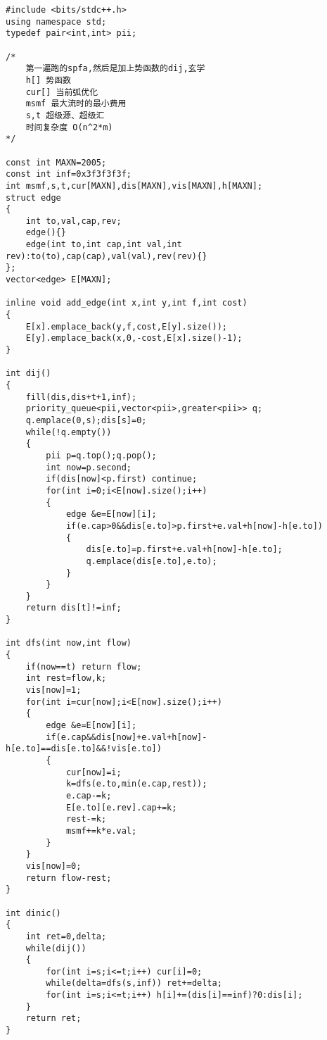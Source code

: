 \begin{lstlisting}
#include <bits/stdc++.h>
using namespace std;
typedef pair<int,int> pii;

/*
    第一遍跑的spfa,然后是加上势函数的dij,玄学
    h[] 势函数
    cur[] 当前弧优化
    msmf 最大流时的最小费用
    s,t 超级源、超级汇
    时间复杂度 O(n^2*m)
*/

const int MAXN=2005;
const int inf=0x3f3f3f3f;
int msmf,s,t,cur[MAXN],dis[MAXN],vis[MAXN],h[MAXN];
struct edge
{
    int to,val,cap,rev;
    edge(){}
    edge(int to,int cap,int val,int rev):to(to),cap(cap),val(val),rev(rev){}
};
vector<edge> E[MAXN];

inline void add_edge(int x,int y,int f,int cost)
{
    E[x].emplace_back(y,f,cost,E[y].size());
    E[y].emplace_back(x,0,-cost,E[x].size()-1);
}

int dij()
{
    fill(dis,dis+t+1,inf);
    priority_queue<pii,vector<pii>,greater<pii>> q;
    q.emplace(0,s);dis[s]=0;
    while(!q.empty())
    {
        pii p=q.top();q.pop();
        int now=p.second;
        if(dis[now]<p.first) continue;
        for(int i=0;i<E[now].size();i++)
        {
            edge &e=E[now][i];
            if(e.cap>0&&dis[e.to]>p.first+e.val+h[now]-h[e.to])
            {
                dis[e.to]=p.first+e.val+h[now]-h[e.to];
                q.emplace(dis[e.to],e.to);
            }
        }
    }
    return dis[t]!=inf;
}

int dfs(int now,int flow)
{
    if(now==t) return flow;
    int rest=flow,k;
    vis[now]=1;
    for(int i=cur[now];i<E[now].size();i++)
    {
        edge &e=E[now][i];
        if(e.cap&&dis[now]+e.val+h[now]-h[e.to]==dis[e.to]&&!vis[e.to])
        {
            cur[now]=i;
            k=dfs(e.to,min(e.cap,rest));
            e.cap-=k;
            E[e.to][e.rev].cap+=k;
            rest-=k;
            msmf+=k*e.val;
        }
    }
    vis[now]=0;
    return flow-rest;
}

int dinic()
{
    int ret=0,delta;
    while(dij())
    {
        for(int i=s;i<=t;i++) cur[i]=0;
        while(delta=dfs(s,inf)) ret+=delta;
        for(int i=s;i<=t;i++) h[i]+=(dis[i]==inf)?0:dis[i];
    }
    return ret;
}
\end{lstlisting}